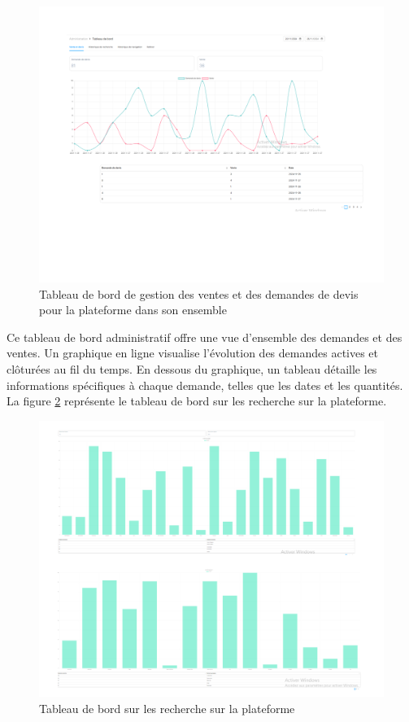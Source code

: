 \documentclass[12pt]{report}
\begin{document}
			\begin{figure}[h]
				\centering
				\includegraphics[width=\textwidth]{dashboard3.png}
				\caption{Tableau de bord de gestion des ventes et des demandes de devis pour la plateforme dans son ensemble}
				\label{fig:dashboard3}
			\end{figure}
			\FloatBarrier

			Ce tableau de bord administratif offre une vue d'ensemble des demandes et des ventes. Un graphique en ligne visualise l'évolution des demandes actives et clôturées au fil du temps. En dessous du graphique, un tableau détaille les informations spécifiques à chaque demande, telles que les dates et les quantités.\\


			La figure \ref{fig:dashboard4} représente le tableau de bord sur les recherche sur la plateforme.

			\begin{figure}[h]
				\centering
				\includegraphics[width=\textwidth]{dashboard4.png}
				\caption{Tableau de bord sur les recherche sur la plateforme}
				\label{fig:dashboard4}
			\end{figure}
			\FloatBarrier
\end{document}
